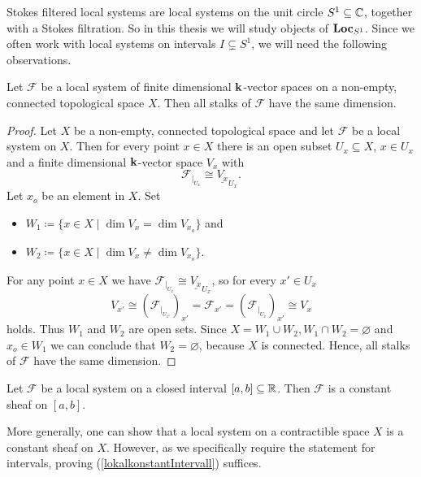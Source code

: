 Stokes filtered local systems are local systems on the unit circle $S^1\subseteq \mathbb{C}$, together with a Stokes filtration. So in this thesis we will study objects of $\mathbf{Loc}_{S^1}$. Since we often work with local systems on intervals $I \subsetneq S^1$, we will need the following observations.

\begin{lem}\label{same dimension}
    Let $\mathcal{F}$ be a local system of finite dimensional $\mathbf{k}$-vector spaces on a non-empty, connected topological space $X$. Then all stalks of $\mathcal{F}$ have the same dimension.
\end{lem}

\begin{proof}
    Let $X$ be a non-empty, connected topological space and let $\mathcal{F}$ be a local system on $X$. Then for every point $x \in X$ there is an open subset $U_x \subseteq X$, $x \in U_x$ and a finite dimensional $\mathbf{k}$-vector space $V_x$ with 
    \[
    \mathcal{F}_{\vert_{U_x}} \cong \underline{V_x}_{U_x}.
    \]
    Let $x_o$ be an element in $X$. Set
    \begin{itemize}
        \item $W_1 \coloneqq \{x \in X \mid \dim V_x = \dim V_{x_o}\}$ and
        \item $W_2 \coloneqq \{x \in X \mid \dim V_x \neq \dim V_{x_o}\}$.
    \end{itemize}
    For any point $x \in X$ we have $\mathcal{F}_{\vert_{U_x}} \cong \underline{V_x}_{U_x}$, so for every $x' \in U_x$
    \[
    V_{x'} \cong \left(\mathcal{F}_{\vert_{U_{x'}}}\right)_{x'} = \mathcal{F}_{x'} = \left(\mathcal{F}_{\vert_{U_x}}\right)_{x'} \cong V_x
    \]
    holds. Thus $W_1$ and $W_2$ are open sets. Since $X = W_1 \cup W_2, W_1 \cap W_2 = \varnothing$ and $x_o \in W_1$ we can conclude that $W_2 = \varnothing$, because $X$ is connected. Hence, all stalks of $\mathcal{F}$ have the same dimension.
\end{proof}

\begin{lem}\label{lokalkonstantIntervall}
    Let $\mathcal{F}$ be a local system on a closed interval $[a,b] \subseteq \mathbb{R}$. Then $\mathcal{F}$ is a constant sheaf on $[a,b]$.
\end{lem}

\begin{rem}
    More generally, one can show that a local system on a contractible space $X$ is a constant sheaf on $X$. However, as we specifically require the statement for intervals, proving (\ref{lokalkonstantIntervall}) suffices.
\end{rem}

